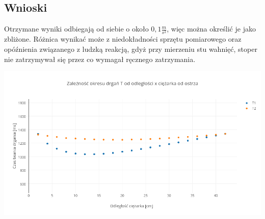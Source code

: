\documentclass{article}
\begin{document}
\subsection{Wnioski}
Otrzymane wyniki odbiegają od siebie o około $0,1\frac{m}{s^2}$, więc można określić je jako zbliżone. Różnica wynikać może z niedokładności sprzętu pomiarowego oraz opóźnienia związanego z ludzką reakcją, gdyż przy mierzeniu stu wahnięć, stoper nie zatrzymywał się przez co wymagał ręcznego zatrzymania. 

\includegraphics[height=0.6\textheight, angle =90]{Plot2.png}
\end{document}
